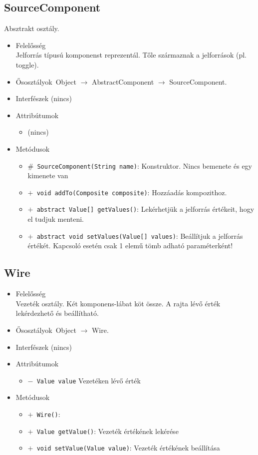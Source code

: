 \subsection{SourceComponent}
Absztrakt osztály.
\begin{itemize}
\item Felelősség\\
Jelforrás típusú komponenst reprezentál. Tőle származnak a jelforrások (pl. toggle).
\item Ősosztályok\ Object $\rightarrow{}$ AbstractComponent $\rightarrow{}$ SourceComponent.
\item Interfészek (nincs)
\item Attribútumok $\ $
\begin{itemize}
\item (nincs)
\end{itemize}
\item Metódusok$\ $
\begin{itemize}
	\item[] \texttt{$\#$ SourceComponent(String name)}: Konstruktor. Nincs bemenete és egy kimenete van
	\item[] \texttt{$+$ void addTo(Composite composite)}: Hozzáadás kompozithoz.
	\item[] \texttt{$+$ abstract Value[] getValues()}: Lekérhetjük a jelforrás értékeit, hogy el tudjuk menteni.
	\item[] \texttt{$+$ abstract void setValues(Value[] values)}: Beállítjuk a jelforrás értékét. Kapcsoló esetén csak 1 elemű tömb  adható paraméterként!
\end{itemize}
\end{itemize}

\subsection{Wire}
\begin{itemize}
\item Felelősség\\
Vezeték osztály. Két komponens-lábat köt össze. A rajta lévő érték lekérdezhető  és beállítható.
\item Ősosztályok\ Object $\rightarrow{}$ Wire.
\item Interfészek (nincs)
\item Attribútumok $\ $
\begin{itemize}
	\item[] \texttt{$-$ Value value} Vezetéken lévő érték
\end{itemize}
\item Metódusok$\ $
\begin{itemize}
	\item[] \texttt{$+$ Wire()}: 
	\item[] \texttt{$+$ Value getValue()}: Vezeték értékének lekérése
	\item[] \texttt{$+$ void setValue(Value value)}: Vezeték értékének beállítása
\end{itemize}
\end{itemize}

